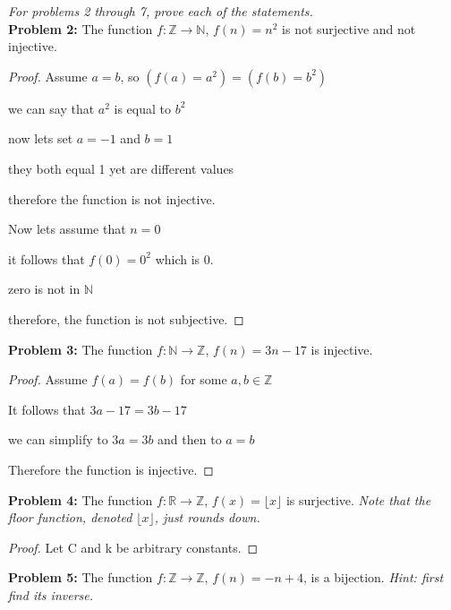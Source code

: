 \documentclass[12pt]{article}
\def\R{\mathbb R} %
\def\Z{\mathbb Z}
\def\N{\mathbb N}
\begin{document}
\textit{For problems 2 through 7, prove each of the statements.} \\ 

{\bf Problem 2:} The function $f:\Z \rightarrow \N$, $f(n)= n^2$ is not surjective and not injective.\\

\begin{proof}

    Assume $a=b$, so $(f(a)=a^2)=(f(b)=b^2)$

    we can say that $a^2$ is equal to $b^2$

    now lets set $a=-1$ and $b=1$

    they both equal 1 yet are different values

    therefore the function is not injective.

    Now lets assume that $n=0$

    it follows that $f(0)=0^2$ which is 0.

    zero is not in $\N$

    therefore, the function is not subjective.

\end{proof}

{\bf Problem 3:} The function $f:\N \rightarrow \Z$, $f(n)= 3n-17$ is injective.\\

\begin{proof}

    Assume $f(a)=f(b)$ for some $a,b\in\Z$

    It follows that $3a-17=3b-17$

    we can simplify to $3a=3b$ and then to $a=b$

    Therefore the function is injective.

\end{proof}

{\bf Problem 4:} The function $f:\R \rightarrow \Z$, $f(x)= \lfloor x \rfloor$ is surjective. \textit{Note that the floor function, denoted $\lfloor x \rfloor$, just rounds down. \\}

\begin{proof}

    Let C and k be arbitrary constants.

    

\end{proof}

{\bf Problem 5:} The function $f:\Z \rightarrow \Z$, $f(n)=-n + 4$, is a bijection. \textit{Hint: first find its inverse.} \\
\end{document}
